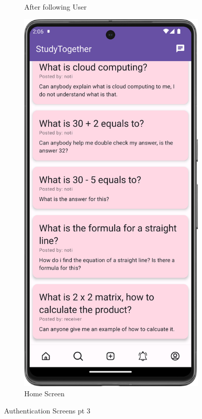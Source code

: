 \begin{figure}[H]
\begin{subfigure}[b]{0.3\textwidth}
    \caption{After following User}
    \label{fig:after_follow_user}
  \end{subfigure}
  \hfill
  \begin{subfigure}[b]{0.3\textwidth}
    \includegraphics[width=\textwidth]{Figures/Product_Images/Auth/home_screen.png}
    \caption{Home Screen}
    \label{fig:home_screen}
  \end{subfigure}
  \caption{Authentication Screens pt 3}
  \label{fig:Authentication_screens_3}
\end{figure}



